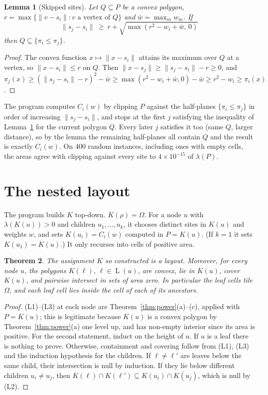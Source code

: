 \documentclass[11pt,a4paper]{article}
\theoremstyle{plain}
\newtheorem{theorem}{Theorem}
\newtheorem{lemma}[theorem]{Lemma}
\theoremstyle{definition}
\theoremstyle{remark}
\newcommand{\area}{\lambda}
\newcommand{\norm}[1]{\lVert #1\rVert}
\newcommand{\leaves}{\operatorname{L}}
\begin{document}
\begin{lemma}[Skipped sites]\label{lem:prune}
Let $Q\subseteq P$ be a convex polygon, $r=\max\{\norm{v-s_i}: v \text{ a vertex of } Q\}$
and $\bar w=\max_m w_m$. If
\[
  \norm{s_j-s_i}\ \ge\ r+\sqrt{\max(r^2-w_i+\bar w,\,0)}
\]
then $Q\subseteq\{\pi_i\le\pi_j\}$.
\end{lemma}
\begin{proof}
The convex function $x\mapsto\norm{x-s_i}$ attains its maximum over $Q$ at a
vertex, so $\norm{x-s_i}\le r$ on $Q$. Then
$\norm{x-s_j}\ge\norm{s_j-s_i}-r\ge 0$, and
$\pi_j(x)\ge(\norm{s_j-s_i}-r)^2-\bar w\ge\max(r^2-w_i+\bar w,0)-\bar w\ge r^2-w_i\ge\pi_i(x)$.
\end{proof}

The program computes $C_i(w)$ by clipping $P$ against the half-planes
$\{\pi_i\le\pi_j\}$ in order of increasing $\norm{s_j-s_i}$, and stops at the
first $j$ satisfying the inequality of Lemma~\ref{lem:prune} for the current
polygon $Q$. Every later $j$ satisfies it too (same $Q$, larger distance), so
by the lemma the remaining half-planes all contain $Q$ and the result is
exactly $C_i(w)$. On 400 random instances, including ones with empty cells,
the areas agree with clipping against every site to $4\times10^{-15}$ of
$\area(P)$.

\section{The nested layout}

The program builds $K$ top-down. $K(\rho)=\Omega$. For a node $u$ with
$\area(K(u))>0$ and children $u_1,\dots,u_k$, it chooses distinct sites in
$K(u)$ and weights $w$, and sets $K(u_i)=C_i(w)$ computed in $P=K(u)$. (If
$k=1$ it sets $K(u_1)=K(u)$.) It only recurses into cells of positive area.

\begin{theorem}\label{thm:nest}
The assignment $K$ so constructed is a layout. Moreover, for every node $u$,
the polygons $K(\ell)$, $\ell\in\leaves(u)$, are convex, lie in $K(u)$, cover
$K(u)$, and pairwise intersect in sets of area zero. In particular the leaf
cells tile $\Omega$, and each leaf cell lies inside the cell of each of its
ancestors.
\end{theorem}
\begin{proof}
(L1)--(L3) at each node are Theorem~\ref{thm:power}(a)--(c), applied with
$P=K(u)$; this is legitimate because $K(u)$ is a convex polygon by
Theorem~\ref{thm:power}(a) one level up, and has non-empty interior since its
area is positive. For the second statement, induct on the height of $u$. If $u$
is a leaf there is nothing to prove. Otherwise, containment and covering follow
from (L1), (L3) and the induction hypothesis for the children. If
$\ell\ne\ell'$ are leaves below the same child, their intersection is null by
induction. If they lie below different children $u_i\ne u_j$, then
$K(\ell)\cap K(\ell')\subseteq K(u_i)\cap K(u_j)$, which is null by (L2).
\end{proof}
\end{document}
